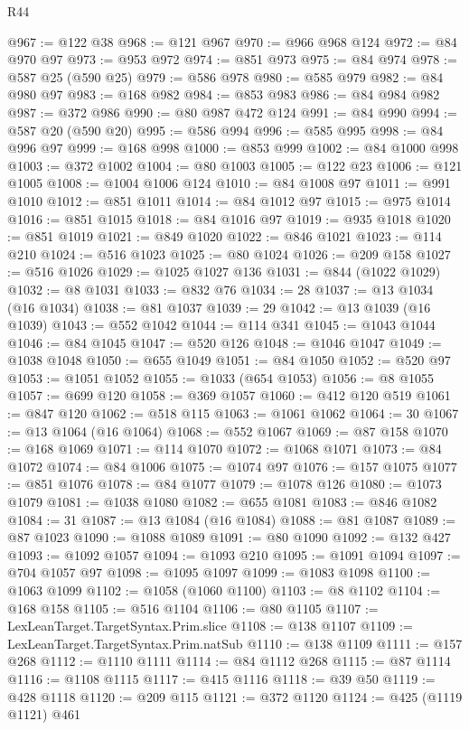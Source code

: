 \begin{lexlean}{R44}
\begin{coremodule}
@967 := @122 @38
@968 := @121 @967
@970 := @966 @968 @124
@972 := @84 @970 @97
@973 := @953 @972
@974 := @851 @973
@975 := @84 @974
@978 := @587 @25 (@590 @25)
@979 := @586 @978
@980 := @585 @979
@982 := @84 @980 @97
@983 := @168 @982
@984 := @853 @983
@986 := @84 @984 @982
@987 := @372 @986
@990 := @80 @987 @472 @124
@991 := @84 @990
@994 := @587 @20 (@590 @20)
@995 := @586 @994
@996 := @585 @995
@998 := @84 @996 @97
@999 := @168 @998
@1000 := @853 @999
@1002 := @84 @1000 @998
@1003 := @372 @1002
@1004 := @80 @1003
@1005 := @122 @23
@1006 := @121 @1005
@1008 := @1004 @1006 @124
@1010 := @84 @1008 @97
@1011 := @991 @1010
@1012 := @851 @1011
@1014 := @84 @1012 @97
@1015 := @975 @1014
@1016 := @851 @1015
@1018 := @84 @1016 @97
@1019 := @935 @1018
@1020 := @851 @1019
@1021 := @849 @1020
@1022 := @846 @1021
@1023 := @114 @210
@1024 := @516 @1023
@1025 := @80 @1024
@1026 := @209 @158
@1027 := @516 @1026
@1029 := @1025 @1027 @136
@1031 := @844 (@1022 @1029)
@1032 := @8 @1031
@1033 := @832 @76
@1034 := 28
@1037 := @13 @1034 (@16 @1034)
@1038 := @81 @1037
@1039 := 29
@1042 := @13 @1039 (@16 @1039)
@1043 := @552 @1042
@1044 := @114 @341
@1045 := @1043 @1044
@1046 := @84 @1045
@1047 := @520 @126
@1048 := @1046 @1047
@1049 := @1038 @1048
@1050 := @655 @1049
@1051 := @84 @1050
@1052 := @520 @97
@1053 := @1051 @1052
@1055 := @1033 (@654 @1053)
@1056 := @8 @1055
@1057 := @699 @120
@1058 := @369 @1057
@1060 := @412 @120 @519
@1061 := @847 @120
@1062 := @518 @115
@1063 := @1061 @1062
@1064 := 30
@1067 := @13 @1064 (@16 @1064)
@1068 := @552 @1067
@1069 := @87 @158
@1070 := @168 @1069
@1071 := @114 @1070
@1072 := @1068 @1071
@1073 := @84 @1072
@1074 := @84 @1006
@1075 := @1074 @97
@1076 := @157 @1075
@1077 := @851 @1076
@1078 := @84 @1077
@1079 := @1078 @126
@1080 := @1073 @1079
@1081 := @1038 @1080
@1082 := @655 @1081
@1083 := @846 @1082
@1084 := 31
@1087 := @13 @1084 (@16 @1084)
@1088 := @81 @1087
@1089 := @87 @1023
@1090 := @1088 @1089
@1091 := @80 @1090
@1092 := @132 @427
@1093 := @1092 @1057
@1094 := @1093 @210
@1095 := @1091 @1094
@1097 := @704 @1057 @97
@1098 := @1095 @1097
@1099 := @1083 @1098
@1100 := @1063 @1099
@1102 := @1058 (@1060 @1100)
@1103 := @8 @1102
@1104 := @168 @158
@1105 := @516 @1104
@1106 := @80 @1105
@1107 := LexLeanTarget.TargetSyntax.Prim.slice
@1108 := @138 @1107
@1109 := LexLeanTarget.TargetSyntax.Prim.natSub
@1110 := @138 @1109
@1111 := @157 @268
@1112 := @1110 @1111
@1114 := @84 @1112 @268
@1115 := @87 @1114
@1116 := @1108 @1115
@1117 := @415 @1116
@1118 := @39 @50
@1119 := @428 @1118
@1120 := @209 @115
@1121 := @372 @1120
@1124 := @425 (@1119 @1121) @461

\end{coremodule}
\end{lexlean}
